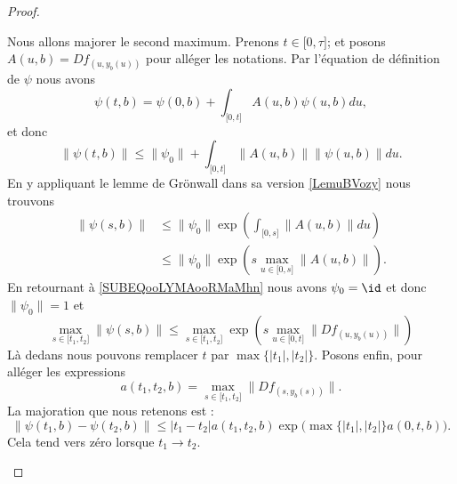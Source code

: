 \begin{proof}
\begin{subproof}
\begin{subproof}
            Nous allons majorer le second maximum. Prenons \( t\in\mathopen[ 0 , \tau \mathclose]\); et posons \( A(u,b)=Df_{(u,y_b(u))}\) pour alléger les notations. Par l'équation de définition de \( \psi\) nous avons
            \begin{equation}
                \psi(t,b)=\psi(0,b)+\int_{\mathopen[ 0 , t \mathclose]}A(u,b)\psi(u,b)du,
            \end{equation}
            et donc
            \begin{equation}
                \| \psi(t,b) \|\leq \| \psi_0 \|+\int_{\mathopen[ 0 , t \mathclose]} \| A(u,b) \|  \| \psi(u,b) \|du.
            \end{equation}
            En y appliquant le lemme de Grönwall dans sa version \ref{LemuBVozy} nous trouvons
            \begin{subequations}
                \begin{align}
                \| \psi(s,b) \|&\leq \| \psi_0 \|\exp\left( \int_{\mathopen[ 0 , s \mathclose]}\| A(u,b) \|du \right)\\
                &\leq \| \psi_0 \|\exp\left( s\max_{u\in\mathopen[ 0 , s \mathclose]}\| A(u,b) \| \right).
                \end{align}
            \end{subequations}
            En retournant à \eqref{SUBEQooLYMAooRMaMhn} nous avons \( \psi_0=\id\) et donc \( \| \psi_0 \|=1\) et
            \begin{equation}
                \max_{s\in\mathopen[ t_1 , t_2 \mathclose]}\| \psi(s,b) \|\leq \max_{s\in \mathopen[ t_1 , t_2 \mathclose]}\exp\left( s\max_{u\in \mathopen[ 0 , t \mathclose]}\| Df_{(u,y_b(u))} \| \right)
            \end{equation}
            Là dedans nous pouvons remplacer \( t\) par \( \max\{ | t_1 |,| t_2 | \}\). Posons enfin, pour alléger les expressions
            \begin{equation}
                a(t_1,t_2,b)=\max_{s\in\mathopen[ t_1 , t_2 \mathclose]}\| Df_{(s,y_b(s))} \|.
            \end{equation}
            La majoration que nous retenons est :
            \begin{equation}
                \| \psi(t_1,b)-\psi(t_2,b) \|\leq | t_1-t_2 |a(t_1,t_2,b)\exp\big( \max\{ | t_1 |,| t_2 | \}a(0,t,b) \big).
            \end{equation}
            Cela tend vers zéro lorsque \( t_1\to t_2\).
            

\end{subproof}
\end{subproof}
\end{proof}
